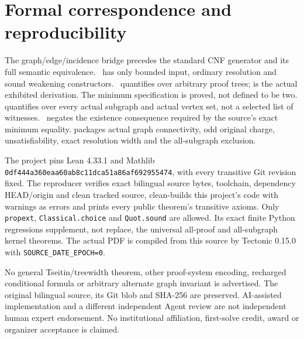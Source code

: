 \documentclass[10pt,a4paper]{article}
\begin{document}
\section{Formal correspondence and reproducibility}
The graph/edge/incidence bridge precedes the standard CNF generator and its full semantic
equivalence. \, has only bounded input, ordinary resolution and sound
weakening constructors. \, quantifies over arbitrary proof trees;
 is the actual exhibited derivation. The minimum specification
 is proved, not defined to be two.
 quantifies over every actual subgraph and actual
vertex set, not a selected list of witnesses. \,
negates the existence consequence required by the source's exact minimum equality.
 packages actual graph connectivity, odd original charge,
unsatisfiability, exact resolution width and the all-subgraph exclusion.

The project pins Lean 4.33.1 and Mathlib
\texttt{0df444a360eaa60ab8c11dca51a86af692955474}, with every transitive Git revision fixed.
The reproducer verifies exact bilingual source bytes, toolchain, dependency HEAD/origin and
clean tracked source, clean-builds this project's code with warnings as errors and prints
every public theorem's transitive axioms. Only \texttt{propext}, \texttt{Classical.choice} and
\texttt{Quot.sound} are allowed. Its exact finite Python regressions supplement, not replace,
the universal all-proof and all-subgraph kernel theorems. The actual PDF is compiled from
this source by Tectonic 0.15.0 with \texttt{SOURCE\_DATE\_EPOCH=0}.

No general Tseitin/treewidth theorem, other proof-system encoding, recharged conditional
formula or arbitrary alternate graph invariant is advertised. The original bilingual source,
its Git blob and SHA-256 are preserved. AI-assisted implementation and a different independent
Agent review are not independent human expert endorsement. No institutional affiliation,
first-solve credit, award or organizer acceptance is claimed.
\end{document}

